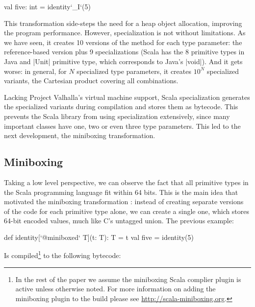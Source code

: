 \begin{lstlisting-nobreak}
 val five: int = identity`_I`(5)
\end{lstlisting-nobreak}

This transformation side-steps the need for a heap object allocation, improving the program performance. However, specialization is not without limitations. As we have seen, it creates 10 versions of the method for each type parameter: the reference-based version plus 9 specializations (Scala has the 8 primitive types in Java and |Unit| primitive type, which corresponds to Java's |void|). And it gets worse: in general, for $N$ specialized type parameters, it creates $10^N$ specialized variants, the Cartesian product covering all combinations.

Lacking Project Valhalla's virtual machine support, Scala specialization generates the specialized variants during compilation and stores them as bytecode. This prevents the Scala library from using specialization extensively, since many important classes have one, two or even three type parameters. This led to the next development, the miniboxing transformation.

\subsection{Miniboxing}

Taking a low level perspective, we can observe the fact that all primitive types in the Scala programming language fit within 64 bits. This is the main idea that motivated the miniboxing transformation \cite{miniboxing}: instead of creating separate versions of the code for each primitive type alone, we can create a single one, which stores 64-bit encoded values, much like C's untagged union.
The previous example:

\begin{lstlisting-nobreak}
 def identity[`@miniboxed` T](t: T): T = t
 val five = identity(5)
\end{lstlisting-nobreak}

Is compiled\footnote{In the rest of the paper we assume the miniboxing Scala complier plugin is active unless otherwise noted. For more information on adding the miniboxing plugin to the build please see \url{http://scala-miniboxing.org}.} to the following bytecode:


